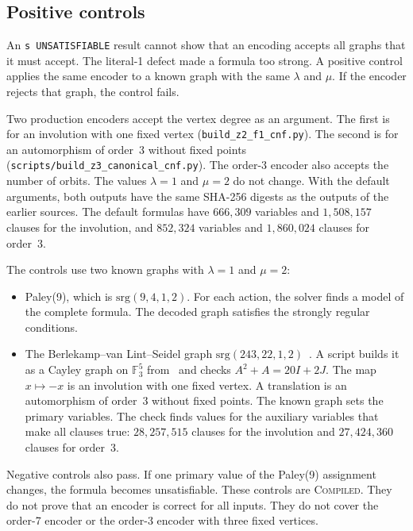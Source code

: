 \documentclass[pdflatex,sn-mathphys-num]{sn-jnl}
\theoremstyle{thmstyleone}
\theoremstyle{thmstyletwo}
\theoremstyle{thmstylethree}
\numberwithin{equation}{section}
\begin{document}
\subsection{Positive controls}
\label{sec:positive_controls}

An \texttt{s UNSATISFIABLE} result cannot show that an encoding accepts all graphs that it must accept. The literal-1 defect made a formula too strong. A positive control applies the same encoder to a known graph with the same $\lambda$ and $\mu$. If the encoder rejects that graph, the control fails.

Two production encoders accept the vertex degree as an argument. The first is for an involution with one fixed vertex (\texttt{build\_z2\_f1\_cnf.py}). The second is for an automorphism of order~3 without fixed points (\texttt{scripts/build\_z3\_canonical\_cnf.py}). The order-3 encoder also accepts the number of orbits. The values $\lambda = 1$ and $\mu = 2$ do not change. With the default arguments, both outputs have the same SHA-256 digests as the outputs of the earlier sources. The default formulas have $666{,}309$ variables and $1{,}508{,}157$ clauses for the involution, and $852{,}324$ variables and $1{,}860{,}024$ clauses for order~3.

The controls use two known graphs with $\lambda = 1$ and $\mu = 2$:
\begin{itemize}
 \item Paley(9), which is $\mathrm{srg}(9, 4, 1, 2)$. For each action, the solver finds a model of the complete formula. The decoded graph satisfies the strongly regular conditions.
 \item The Berlekamp--van Lint--Seidel graph $\mathrm{srg}(243, 22, 1, 2)$~\cite{berlekamp1973strongly}. A script builds it as a Cayley graph on $\mathbb{F}_3^5$ from~\cite{zaw2020deza} and checks $A^2 + A = 20I + 2J$. The map $x \mapsto -x$ is an involution with one fixed vertex. A translation is an automorphism of order~3 without fixed points. The known graph sets the primary variables. The check finds values for the auxiliary variables that make all clauses true: $28{,}257{,}515$ clauses for the involution and $27{,}424{,}360$ clauses for order~3.
\end{itemize}
Negative controls also pass. If one primary value of the Paley(9) assignment changes, the formula becomes unsatisfiable.
These controls are \textsc{Compiled}. They do not prove that an encoder is correct for all inputs. They do not cover the order-7 encoder or the order-3 encoder with three fixed vertices.
\end{document}
